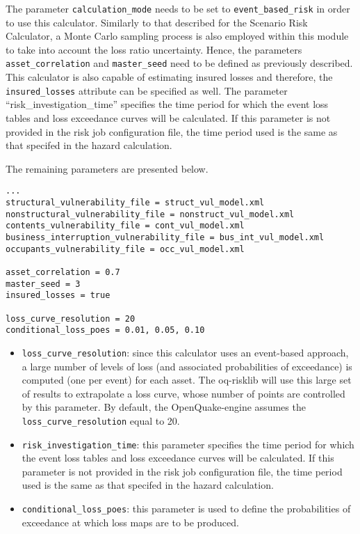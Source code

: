 The parameter \Verb+calculation_mode+ needs to be set to
\Verb+event_based_risk+ in order to use this calculator. Similarly to that
described for the Scenario Risk Calculator, a Monte Carlo sampling process is
also employed within this module to take into account the loss ratio
uncertainty. Hence, the parameters \Verb+asset_correlation+ and
\Verb+master_seed+ need to be defined as previously described. This calculator
is also capable of estimating insured losses and therefore, the
\Verb+insured_losses+ attribute can be specified as well. The parameter
``risk\_investigation\_time'' specifies the time period for which the event
loss tables and loss exceedance curves will be calculated. If this parameter
is not provided in the risk job configuration file, the time period used is
the same as that specifed in the hazard calculation.

The remaining parameters are presented below.

\begin{Verbatim}[frame=single, commandchars=\\\{\}, samepage=true]
...
structural_vulnerability_file = struct_vul_model.xml
nonstructural_vulnerability_file = nonstruct_vul_model.xml
contents_vulnerability_file = cont_vul_model.xml
business_interruption_vulnerability_file = bus_int_vul_model.xml
occupants_vulnerability_file = occ_vul_model.xml

asset_correlation = 0.7
master_seed = 3
insured_losses = true

loss_curve_resolution = 20
conditional_loss_poes = 0.01, 0.05, 0.10
\end{Verbatim}

\begin{itemize}

  \item \Verb+loss_curve_resolution+: since this calculator uses an event-based
    approach, a large number of levels of loss (and associated probabilities of
    exceedance) is computed (one per event) for each asset. The oq-risklib will
    use this large set of results to extrapolate a loss curve, whose number of
    points are controlled by this parameter. By default, the OpenQuake-engine
    assumes the \Verb+loss_curve_resolution+ equal to 20.

  \item \Verb+risk_investigation_time+: this parameter specifies the time
    period for which the event loss tables and loss exceedance curves will be
    calculated. If this parameter is not provided in the risk job configuration
    file, the time period used is the same as that specifed in the hazard
    calculation.

  \item \Verb+conditional_loss_poes+: this parameter is used to define the
    probabilities of exceedance at which loss maps are to be produced.

\end{itemize}